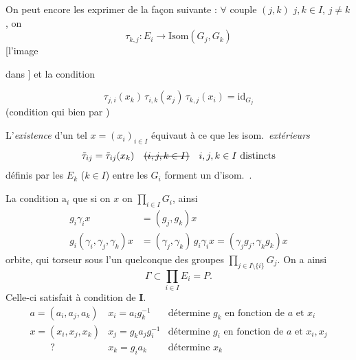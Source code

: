 \documentclass[11pt,a4paper]{article}
\begin{document}
\struck{\ill{}} On peut encore les exprimer de la façon suivante : $\forall$ couple $(j,k)$ $j,k\in I$, $j\neq k$, on \ill{}
\[
  \tau_{k,j}: E_i\to\mathrm{Isom}(G_j,G_k)
\]
[l'image \ill{} \ill{}

dans   ] et la condition \ill{}


\[
  \tau_{j,i}(x_k)\,\tau_{i,k}(x_j)\,\tau_{k,j}(x_i)=\mathrm{id}_{G_j}
\]
(condition qui \ill{} bien  par )

L'\emph{existence} d'un tel $x=(x_i)_{i\in I}$ équivaut à ce que les isom.\ \emph{extérieurs}
\[
  \tilde\tau_{ij}=\tilde\tau_{ij}(x_k)\quad \text{\struck{$(i,j,k\in I)$}}\quad i,j,k\in I \text{ distincts}
\]
définis par les $E_k$ ($k\in I$) entre les $G_i$ forment un   d'isom.\ .

La condition $\mathrm{a}_i$  que si on \ill{} $x$ on  \ill{} \ill{} \ill{} $\prod_{i\in I}G_i$, \struck{\ill{}} \add{\ill{}} \ill{} ainsi \ill{} \ill{}  \ill{} \ill{}
\[
  \begin{aligned}
    g_i\gamma_ix &= (g_j,g_k)x\\
    g_i(\gamma_i,\gamma_j,\gamma_k)x &= (\gamma_j,\gamma_k)\,g_i\gamma_ix = (\gamma_jg_j,\gamma_kg_k)x
  \end{aligned}
\]
orbite, qui \ill{}  torseur sous l'un quelconque des  groupes $\prod_{j\in I\setminus\{i\}}G_j$. On a ainsi   
\[
  \Gamma\subset\prod_{i\in I}E_i=P .
\]
Celle-ci satisfait à \struck{\ill{}}  condition de \textbf{I}.
\[
  \begin{array}{lll}
    a=(a_i,a_j,a_k) & x_i=a_ig_k^{-1} & \text{détermine } g_k \text{ en fonction de } a \text{ et } x_i\\
    x=(x_i,x_j,x_k) & x_j=g_ka_jg_i^{-1} & \text{détermine } g_i \text{ en fonction de } a \text{ et } x_i,x_j\\
    \phantom{x=}\ ? & x_k=g_ia_k & \text{détermine } x_k
  \end{array}
\]
\end{document}
